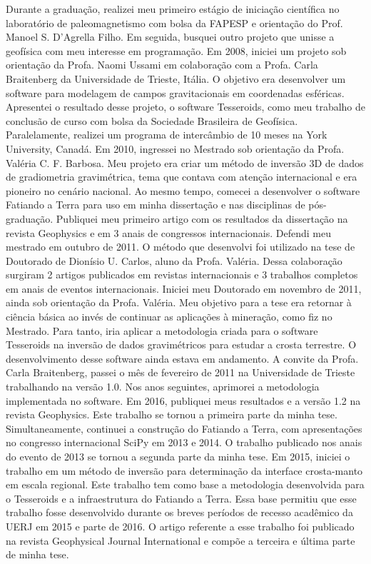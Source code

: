 Durante a graduação, realizei meu primeiro estágio de iniciação científica no
laboratório de paleomagnetismo com bolsa da FAPESP e orientação do Prof. Manoel
S. D'Agrella Filho. Em seguida, busquei outro projeto que unisse a geofísica
com meu interesse em programação. Em 2008, iniciei um projeto sob orientação da
Profa. Naomi Ussami em colaboração com a Profa. Carla Braitenberg da
Universidade de Trieste, Itália. O objetivo era desenvolver um software para
modelagem de campos gravitacionais em coordenadas esféricas. Apresentei o
resultado desse projeto, o software Tesseroids, como meu trabalho de conclusão
de curso com bolsa da Sociedade Brasileira de Geofísica. Paralelamente,
realizei um programa de intercâmbio de 10 meses na York University, Canadá.
Em 2010, ingressei no Mestrado sob orientação da Profa. Valéria C. F. Barbosa.
Meu projeto era criar um método de inversão 3D de dados de gradiometria
gravimétrica, tema que contava com atenção internacional e era pioneiro no
cenário nacional. Ao mesmo tempo, comecei a desenvolver o software Fatiando a
Terra para uso em minha dissertação e nas disciplinas de pós-graduação.
Publiquei meu primeiro artigo com os resultados da dissertação na revista
Geophysics e em 3 anais de congressos internacionais. Defendi meu mestrado em
outubro de 2011. O método que desenvolvi foi utilizado na tese de Doutorado de
Dionísio U. Carlos, aluno da Profa. Valéria. Dessa colaboração surgiram 2
artigos publicados em revistas internacionais e 3 trabalhos completos em anais
de eventos internacionais.
Iniciei meu Doutorado em novembro de 2011, ainda sob orientação da Profa.
Valéria. Meu objetivo para a tese era retornar à ciência básica ao invés de
continuar as aplicações à mineração, como fiz no Mestrado. Para tanto, iria
aplicar a metodologia criada para o software Tesseroids na inversão de dados
gravimétricos para estudar a crosta terrestre. O desenvolvimento desse software
ainda estava em andamento. A convite da Profa. Carla Braitenberg, passei o mês
de fevereiro de 2011 na Universidade de Trieste trabalhando na versão 1.0. Nos
anos seguintes, aprimorei a metodologia implementada no software. Em 2016,
publiquei meus resultados e a versão 1.2 na revista Geophysics. Este trabalho
se tornou a primeira parte da minha tese. Simultaneamente, continuei a
construção do Fatiando a Terra, com apresentações no congresso internacional
SciPy em 2013 e 2014. O trabalho publicado nos anais do evento de 2013 se
tornou a segunda parte da minha tese. Em 2015, iniciei o trabalho em um método
de inversão para determinação da interface crosta-manto em escala regional.
Este trabalho tem como base a metodologia desenvolvida para o Tesseroids e a
infraestrutura do Fatiando a Terra. Essa base permitiu que esse trabalho fosse
desenvolvido durante os breves períodos de recesso acadêmico da UERJ em 2015 e
parte de 2016. O artigo referente a esse trabalho foi publicado na revista
Geophysical Journal International e compõe a terceira e última parte de minha
tese.

